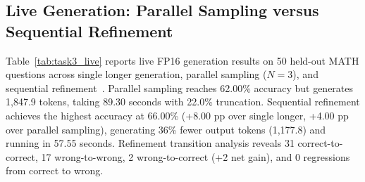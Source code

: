 \documentclass{article}
\begin{document}
\begin{table}[!htbp]
\centering
\caption{Live FP16 generation comparison on 50 held-out MATH questions using Qwen2.5-3B-Instruct. Runtime is measured end-to-end on a single GPU.}
\label{tab:task3_live}
\end{table}

\subsection{Live Generation: Parallel Sampling versus Sequential Refinement}
Table~\ref{tab:task3_live} reports live FP16 generation results on 50 held-out MATH questions across single longer generation, parallel sampling ($N=3$), and sequential refinement~\cite{madaan2023selfrefine}. Parallel sampling reaches 62.00\% accuracy but generates 1,847.9 tokens, taking 89.30 seconds with 22.0\% truncation. Sequential refinement achieves the highest accuracy at 66.00\% (+8.00 pp over single longer, +4.00 pp over parallel sampling), generating 36\% fewer output tokens (1,177.8) and running in 57.55 seconds. Refinement transition analysis reveals 31 correct-to-correct, 17 wrong-to-wrong, 2 wrong-to-correct (+2 net gain), and 0 regressions from correct to wrong.
\end{document}
